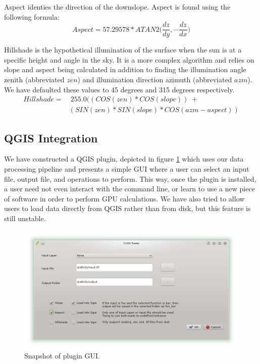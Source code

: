 \documentclass[journal]{IEEEtran}
\begin{document}
    Aspect identies the direction of the downslope. Aspect is found using
    the following formula:
    \[Aspect = 57.29578 * ATAN2\bigg(\frac{dz}{dy}, -\frac{dz}{dx}\bigg)\]

    Hillshade is the hypothetical illumination of the surface when the sun is
    at a specific height and angle in the sky. It is a more complex algorithm
    and relies on slope and aspect being calculated in addition to finding the
    illumination angle zenith (abbreviated \(zen\)) and illumination
    direction azimuth (abbreviated \(azm\)). We have defaulted these values
    to 45 degrees and 315 degrees respectively.
    \begin{align*}
        Hillshade =& ~ 255.0 ((COS(zen) * COS(slope)) ~ +  \\
                   &(SIN(zen) * SIN(slope) * COS(azm - aspect))
    \end{align*}

    \subsection{QGIS Integration}
    We have constructed a QGIS plugin, depicted in figure \ref{gui} which uses
    our data processing pipeline and presents a simple GUI where a user can
    select an input file, output file, and operations to perform. This way,
    once the plugin is installed, a user need not even interact with the
    command line, or learn to use a new piece of software in order to perform
    GPU calculations. We have also tried to allow users to load data directly
    from QGIS rather than from disk, but this feature is still unstable.
    \begin{figure}
        \includegraphics[width=\linewidth]{gui.png}
        \caption{Snapshot of plugin GUI.}
        \label{gui}
    \end{figure}
\end{document}
